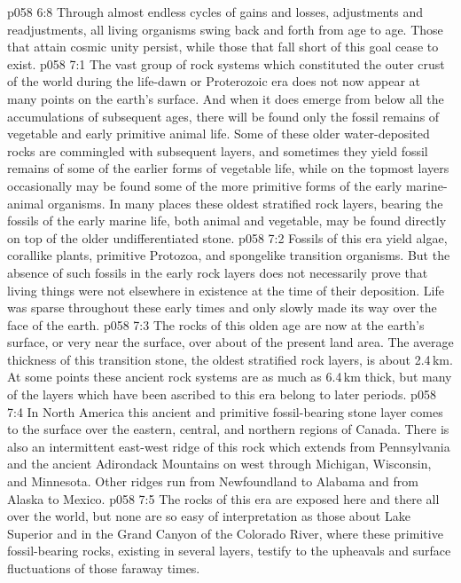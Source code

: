 \vs p058 6:8 Through almost endless cycles of gains and losses, adjustments and readjustments, all living organisms swing back and forth from age to age. Those that attain cosmic unity persist, while those that fall short of this goal cease to exist.
\vs p058 7:1 The vast group of rock systems which constituted the outer crust of the world during the life\hyp{}dawn or Proterozoic era does not now appear at many points on the earth’s surface. And when it does emerge from below all the accumulations of subsequent ages, there will be found only the fossil remains of vegetable and early primitive animal life. Some of these older water\hyp{}deposited rocks are commingled with subsequent layers, and sometimes they yield fossil remains of some of the earlier forms of vegetable life, while on the topmost layers occasionally may be found some of the more primitive forms of the early marine\hyp{}animal organisms. In many places these oldest stratified rock layers, bearing the fossils of the early marine life, both animal and vegetable, may be found directly on top of the older undifferentiated stone.
\vs p058 7:2 Fossils of this era yield algae, corallike plants, primitive Protozoa, and spongelike transition organisms. But the absence of such fossils in the early rock layers does not necessarily prove that living things were not elsewhere in existence at the time of their deposition. Life was sparse throughout these early times and only slowly made its way over the face of the earth.
\vs p058 7:3 \pc The rocks of this olden age are now at the earth’s surface, or very near the surface, over about  of the present land area. The average thickness of this transition stone, the oldest stratified rock layers, is about 2.4\,km. At some points these ancient rock systems are as much as 6.4\,km thick, but many of the layers which have been ascribed to this era belong to later periods.
\vs p058 7:4 In North America this ancient and primitive fossil\hyp{}bearing stone layer comes to the surface over the eastern, central, and northern regions of Canada. There is also an intermittent east\hyp{}west ridge of this rock which extends from Pennsylvania and the ancient Adirondack Mountains on west through Michigan, Wisconsin, and Minnesota. Other ridges run from Newfoundland to Alabama and from Alaska to Mexico.
\vs p058 7:5 The rocks of this era are exposed here and there all over the world, but none are so easy of interpretation as those about Lake Superior and in the Grand Canyon of the Colorado River, where these primitive fossil\hyp{}bearing rocks, existing in several layers, testify to the upheavals and surface fluctuations of those faraway times.
